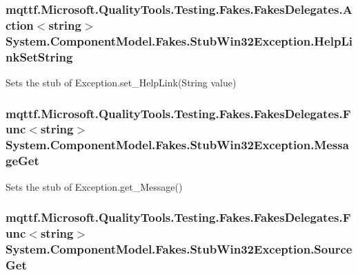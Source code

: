 \hypertarget{class_system_1_1_component_model_1_1_fakes_1_1_stub_win32_exception_a77c7c06d9c254cc0005375c4a02bb748}{
\subsubsection[{Help\-Link\-Set\-String}]{\setlength{\rightskip}{0pt plus 5cm}mqttf.\-Microsoft.\-Quality\-Tools.\-Testing.\-Fakes.\-Fakes\-Delegates.\-Action$<$string$>$ System.\-Component\-Model.\-Fakes.\-Stub\-Win32\-Exception.\-Help\-Link\-Set\-String}}\label{class_system_1_1_component_model_1_1_fakes_1_1_stub_win32_exception_a77c7c06d9c254cc0005375c4a02bb748}


Sets the stub of Exception.\-set\-\_\-\-Help\-Link(\-String value)

\hypertarget{class_system_1_1_component_model_1_1_fakes_1_1_stub_win32_exception_ac5fd11ff51b1a4acb4c75a3bd7c5fdd8}{
\subsubsection[{Message\-Get}]{\setlength{\rightskip}{0pt plus 5cm}mqttf.\-Microsoft.\-Quality\-Tools.\-Testing.\-Fakes.\-Fakes\-Delegates.\-Func$<$string$>$ System.\-Component\-Model.\-Fakes.\-Stub\-Win32\-Exception.\-Message\-Get}}\label{class_system_1_1_component_model_1_1_fakes_1_1_stub_win32_exception_ac5fd11ff51b1a4acb4c75a3bd7c5fdd8}


Sets the stub of Exception.\-get\-\_\-\-Message()

\hypertarget{class_system_1_1_component_model_1_1_fakes_1_1_stub_win32_exception_a8909f646aee9c3eb7e0a2d70bee1821f}{
\subsubsection[{Source\-Get}]{\setlength{\rightskip}{0pt plus 5cm}mqttf.\-Microsoft.\-Quality\-Tools.\-Testing.\-Fakes.\-Fakes\-Delegates.\-Func$<$string$>$ System.\-Component\-Model.\-Fakes.\-Stub\-Win32\-Exception.\-Source\-Get}}\label{class_system_1_1_component_model_1_1_fakes_1_1_stub_win32_exception_a8909f646aee9c3eb7e0a2d70bee1821f}


